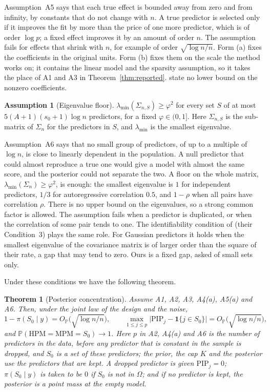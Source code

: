 \documentclass[11pt]{article}
\renewcommand{\P}{\mathbb{P}}
\newcommand{\ind}[1]{\mathbf{1}\{#1\}}
\newcommand{\lmin}{\lambda_{\min}}
\newcommand{\Sz}{S_0}
\newcommand{\sz}{s_0}
\newcommand{\Sig}{\Sigma_n}
\newcommand{\Om}{\Omega}
\newcommand{\pis}[1]{\pi(#1\mid y)}
\newcommand{\PIP}{\mathrm{PIP}}
\newcommand{\HPM}{\mathrm{HPM}}
\newcommand{\MPM}{\mathrm{MPM}}
\newcommand{\rn}{\sqrt{\log n/n}}
\newcommand{\OP}{O_{\P}}
\theoremstyle{plain}
\newtheorem{thm}{Theorem}
\theoremstyle{definition}
\newtheorem{asm}{Assumption}
\begin{document}
Assumption~A5 says that each true effect is bounded away from zero and from infinity, by constants that do not change
with $n$. A true predictor is selected only if it improves the fit by more than the price of one more predictor, which
is of order $\log p$; a fixed effect improves it by an amount of order $n$. The assumption fails for effects that shrink
with $n$, for example of order $\rn$. Form (a) fixes the coefficients in the original units. Form (b) fixes them on the
scale the method works on; it contains the linear model and the sparsity assumption, so it takes the place of A1 and A3
in Theorem~\ref{thm:reported}. \citet{SongLiang2015} state no lower bound on the nonzero coefficients.

\begin{asm}[Eigenvalue floor]\label{a:efs}
$\lmin(\Sigma_{n,S})\ge\varphi^2$ for every set $S$ of at most $5(A+1)(\sz+1)\log n$ predictors, for a fixed
$\varphi\in(0,1]$. Here $\Sigma_{n,S}$ is the sub-matrix of $\Sig$ for the predictors in $S$, and $\lmin$ is the
smallest eigenvalue.
\end{asm}

Assumption~A6 says that no small group of predictors, of up to a multiple of $\log n$, is close to linearly dependent
in the population. A null predictor that could almost reproduce a true one would give a model with almost the same
score, and the posterior could not separate the two. A floor on the whole matrix, $\lmin(\Sig)\ge\varphi^2$, is enough:
the smallest eigenvalue is $1$ for independent predictors, $1/3$ for autoregressive correlation $0.5$, and $1-\rho$ when
all pairs have correlation $\rho$. There is no upper bound on the eigenvalues, so a strong common factor is allowed. The
assumption fails when a predictor is duplicated, or when the correlation of some pair tends to one. The identifiability
condition of \citet{SongLiang2015} (their Condition~3) plays the same role. For Gaussian predictors it holds when the
smallest eigenvalue of the covariance matrix is of larger order than the square of their rate, a gap that may tend to
zero. Ours is a fixed gap, asked of small sets only.

Under these conditions we have the following theorem.

\begin{thm}[Posterior concentration]\label{thm:post}
Assume A1, A2, A3, A4(a), A5(a) and A6. Then, under the joint law of the design and the noise,
\[
  1-\pis{\Sz}=\OP\big(\rn\big),\qquad
  \max_{1\le j\le p}\big|\PIP_j-\ind{j\in\Sz}\big|=\OP\big(\rn\big),
\]
and $\P(\HPM=\MPM=\Sz)\to1$. Here $p$ in A2, A4(a) and A6 is the number of predictors in the data, before any predictor
that is constant in the sample is dropped, and $\Sz$ is a set of these predictors; the prior, the cap $K$ and the
posterior use the predictors that are kept. A dropped predictor is given $\PIP_j=0$; $\pis{\Sz}$ is taken to be $0$ if
$\Sz$ is not in $\Om$; and if no predictor is kept, the posterior is a point mass at the empty model.
\end{thm}
\end{document}
